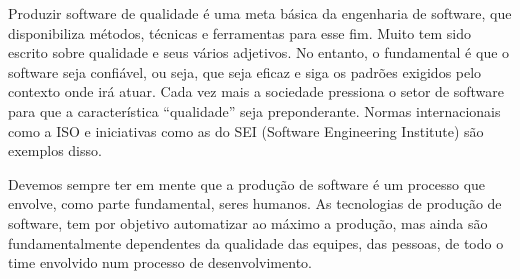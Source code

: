 Produzir software de qualidade é uma meta básica da engenharia de software, que
disponibiliza métodos, técnicas e ferramentas para esse fim. Muito tem sido escrito sobre
qualidade e seus vários adjetivos. No entanto, o fundamental é que o software seja
confiável, ou seja, que seja eficaz e siga os padrões exigidos pelo contexto onde irá atuar.
Cada vez mais a sociedade pressiona o setor de software para que a característica
“qualidade” seja preponderante. Normas internacionais como a ISO e iniciativas como as
do SEI (Software Engineering Institute) são exemplos disso.

Devemos sempre ter em mente que a produção de software é um processo que envolve,
como parte fundamental, seres humanos. As tecnologias de produção de software, tem por
objetivo automatizar ao máximo a produção, mas ainda são fundamentalmente dependentes
da qualidade das equipes, das pessoas, de todo o time envolvido num processo de
desenvolvimento.

\nocite{cmmcmmi}
